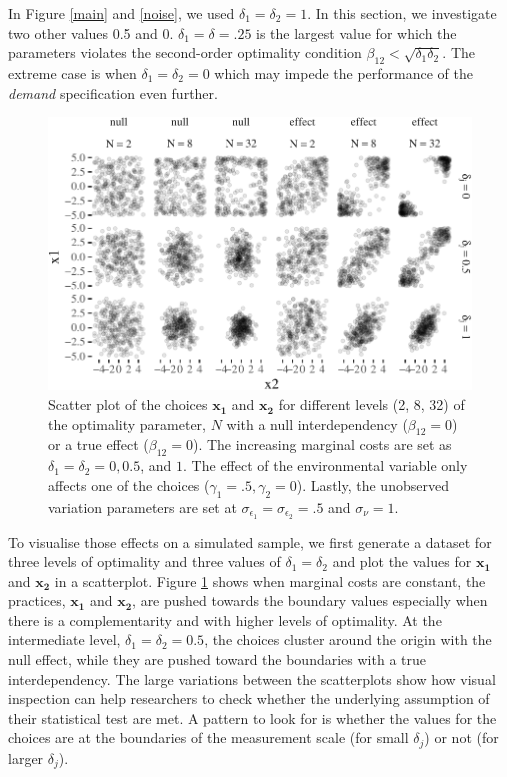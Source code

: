 \documentclass[12pt]{article}
\begin{document}
In Figure \ref{main} and \ref{noise}, we used \(\delta_1 = \delta_2 = 1\). In this section, we investigate two other values 0.5 and 0. \(\delta_1 = \delta = .25\) is the largest value for which the parameters violates the second-order optimality condition \(\beta_{12} < \sqrt{\delta_1 \delta_2}\). The extreme case is when \(\delta_1 = \delta_2 = 0\) which may impede the performance of the \emph{demand} specification even further.

\begin{figure}

\includegraphics[width=500px]{figure-latex/scatterplot-delta-1}
\caption[Error Rate and Power with Different Levels of Marginal
Costs]{\label{scatter-delta} Scatter plot of the choices $\mathbf{x_1}$ and
$\mathbf{x_2}$ for different levels (2, 8, 32) of the optimality parameter, $N$
with a null interdependency ($\beta_{12} = 0$) or a true effect ($\beta_{12} =
0$). The increasing marginal costs are set as $\delta_1 = \delta_2 = 0, 0.5$,
and $1$. The effect of the environmental variable only affects one of the
choices ($\gamma_1 = .5, \gamma_2 = 0$). Lastly, the unobserved variation
parameters are set at $\sigma_{\epsilon_1} = \sigma_{\epsilon_2} = .5$ and
$\sigma_{\nu} = 1.$ }
\end{figure}

To visualise those effects on a simulated sample, we first generate a dataset for three levels of optimality and three values of \(\delta_1 = \delta_2\) and plot the values for \(\mathbf{x_1}\) and \(\mathbf{x_2}\) in a scatterplot. Figure \ref{scatter-delta} shows when marginal costs are constant, the practices, \(\mathbf{x_1}\) and \(\mathbf{x_2}\), are pushed towards the boundary values especially when there is a complementarity and with higher levels of optimality. At the intermediate level, \(\delta_1 = \delta_2 = 0.5\), the choices cluster around the origin with the null effect, while they are pushed toward the boundaries with a true interdependency. The large variations between the scatterplots show how visual inspection can help researchers to check whether the underlying assumption of their statistical test are met. A pattern to look for is whether the values for the choices are at the boundaries of the measurement scale (for small \(\delta_j\)) or not (for larger \(\delta_j\)).
\end{document}
